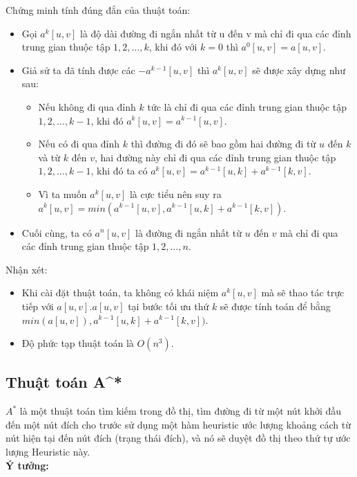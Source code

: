 \documentclass[a4paper,12pt]{report}
\begin{document}
Chứng minh tính đúng đắn của thuật toán:\\
\begin{itemize}
	\item Gọi $ a^{k}[u, v] $ là độ dài đường đi ngắn nhất từ u đến v mà chỉ đi qua các đỉnh trung gian thuộc tập $ {1, 2, \ldots, k} $, khi đó với $ k = 0 $ thì $ a^{0}[u, v] = a[u, v] $.
	\item Giả sử ta đã tính được các $ - a^{k-1}[u, v] $ thì $ a^{k}[u, v] $ sẽ được xây dựng như sau:
	\begin{itemize}
	\item Nếu không đi qua đỉnh $k$ tức là chỉ đi qua các đỉnh trung gian thuộc tập $ {1, 2, \ldots, k-1} $, khi đó $ a^{k}[u, v] = a^{k-1}[u, v]  $.
	\item Nếu có đi qua đỉnh $k$ thì đường đi đó sẽ bao gồm hai đường đi từ $u$ đến $k$ và từ $k$ đến $v$, hai đường này chỉ đi qua các đỉnh trung gian thuộc tập $ {1, 2, \ldots, k-1} $, khi đó ta có $ a^{k}[u, v] = a^{k-1}[u, k] + a^{k-1}[k, v] $.
	\item Vì ta muốn $ a^{k}[u, v] $ là cực tiểu nên suy ra $ a^{k}[u, v] = min(a^{k-1}[u, v], a^{k-1}[u, k] + a^{k-1}[k, v]) $.
	\end{itemize} 
	\item Cuối cùng, ta có $ a^{n}[u, v] $ là đường đi ngắn nhất từ $u$ đến $v$ mà chỉ đi qua các đỉnh trung gian thuộc tập $ {1, 2, \ldots, n} $.

\end{itemize}
Nhận xét:\\
\begin{itemize}
 \item Khi cài đặt thuật toán, ta không có khái niệm $ a^{k}[u, v] $ mà sẽ thao tác trực tiếp với $ a[u, v] $.$ a[u, v] $ tại bước tối ưu thứ $k$ sẽ được tính toán để bằng $ min(a[u, v]), a^{k-1}[u, k] + a^{k-1}[k, v]) $.
 \item Độ phức tạp thuật toán là $ O(n^{3}) $.

\end{itemize}


\subsection{Thuật toán A^{*}}


	$ A^{*} $ là một thuật toán tìm kiếm trong đồ thị, tìm đường đi từ một nút khởi đầu đến một nút đích cho trước sử dụng một hàm heuristic ước lượng khoảng cách từ nút hiện tại đến nút đích (trạng thái đích), và nó sẽ duyệt đồ thị theo thứ tự ước lượng Heuristic này.\\
	\textbf{Ý tưởng:}
\end{document}
